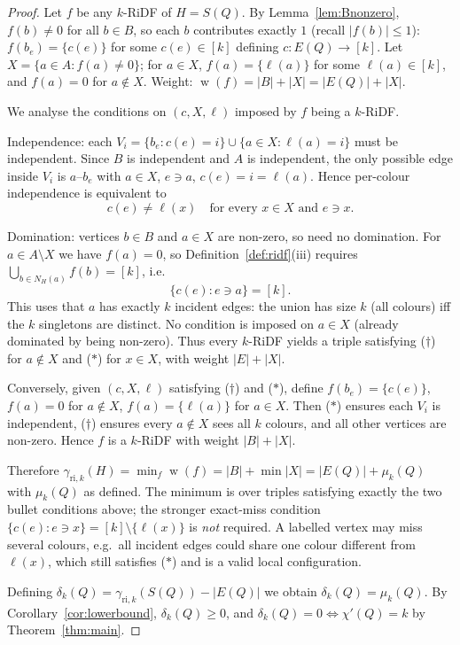 \documentclass[10pt,a4paper]{amsart}
\DeclareMathOperator{\weight}{w}
\newcommand{\gri}{\gamma_{\mathrm{ri},k}}
\newcommand{\setK}{[k]}
\begin{document}
\begin{proof}
Let $f$ be any $k$-RiDF of $H=S(Q)$. By Lemma~\ref{lem:Bnonzero}, $f(b)\neq0$ for all $b\in B$, so each $b$ contributes exactly $1$ (recall $|f(b)|\le 1$): $f(b_{e})=\{c(e)\}$ for some $c(e)\in\setK$ defining $c\colon E(Q)\to\setK$.
Let $X=\{a\in A: f(a)\neq0\}$; for $a\in X$, $f(a)=\{\ell(a)\}$ for some $\ell(a)\in\setK$, and $f(a)=0$ for $a\notin X$.
Weight: $\weight(f)=|B|+|X|=|E(Q)|+|X|$.

We analyse the conditions on $(c,X,\ell)$ imposed by $f$ being a $k$-RiDF.

Independence: each $V_{i}=\{b_{e}:c(e)=i\}\cup\{a\in X:\ell(a)=i\}$ must be independent. Since $B$ is independent and $A$ is independent, the only possible edge inside $V_{i}$ is $a$--$b_{e}$ with $a\in X$, $e\ni a$, $c(e)=i=\ell(a)$.
Hence per-colour independence is equivalent to
\[
c(e)\neq\ell(x)\quad\text{for every }x\in X\text{ and }e\ni x. \tag{$\ast$}
\]

Domination: vertices $b\in B$ and $a\in X$ are non-zero, so need no domination.
For $a\in A\setminus X$ we have $f(a)=0$, so Definition~\ref{def:ridf}(iii) requires $\bigcup_{b\in N_{H}(a)}f(b)=\setK$, i.e.
\[
\{c(e): e\ni a\}=\setK. \tag{$\dagger$}
\]
This uses that $a$ has exactly $k$ incident edges: the union has size $k$ (all colours) iff the $k$ singletons are distinct. No condition is imposed on $a\in X$ (already dominated by being non-zero).
Thus every $k$-RiDF yields a triple satisfying ($\dagger$) for $a\notin X$ and ($\ast$) for $x\in X$, with weight $|E|+|X|$.

Conversely, given $(c,X,\ell)$ satisfying ($\dagger$) and ($\ast$), define $f(b_{e})=\{c(e)\}$, $f(a)=0$ for $a\notin X$, $f(a)=\{\ell(a)\}$ for $a\in X$.
Then ($\ast$) ensures each $V_{i}$ is independent, ($\dagger$) ensures every $a\notin X$ sees all $k$ colours, and all other vertices are non-zero. Hence $f$ is a $k$-RiDF with weight $|B|+|X|$.

Therefore $\gri(H)=\min_{f}\weight(f)=|B|+\min|X|=|E(Q)|+\mu_{k}(Q)$ with $\mu_{k}(Q)$ as defined. The minimum is over triples satisfying exactly the two bullet conditions above; the stronger exact-miss condition $\{c(e):e\ni x\}=\setK\setminus\{\ell(x)\}$ is \emph{not} required. A labelled vertex may miss several colours, e.g.\ all incident edges could share one colour different from $\ell(x)$, which still satisfies ($\ast$) and is a valid local configuration.

Defining $\delta_{k}(Q)=\gri(S(Q))-|E(Q)|$ we obtain $\delta_{k}(Q)=\mu_{k}(Q)$. By Corollary~\ref{cor:lowerbound}, $\delta_{k}(Q)\ge0$, and $\delta_{k}(Q)=0\iff\chi'(Q)=k$ by Theorem~\ref{thm:main}.
\end{proof}
\end{document}
